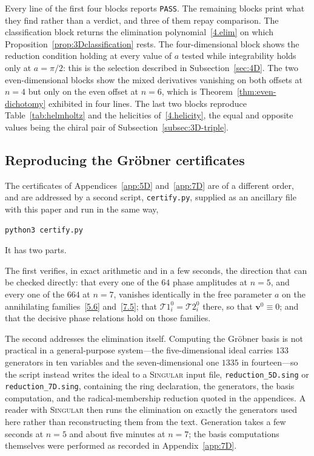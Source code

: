 \documentclass[11pt]{jfm}
\numberwithin{equation}{section}
\begin{document}
\noindent Every line of the first four blocks reports \texttt{PASS}. The remaining blocks print
what they find rather than a verdict, and three of them repay comparison. The classification block
returns the elimination polynomial~\eqref{4.elim} on which Proposition~\ref{prop:3Dclassification}
rests. The four-dimensional block shows the reduction condition holding at every value of $a$
tested while integrability holds only at $a=\pi/2$: this is the selection described in
Subsection~\ref{sec:4D}. The two even-dimensional blocks show the mixed derivatives vanishing on
both offsets at $n=4$ but only on the even offset at $n=6$, which is
Theorem~\ref{thm:even-dichotomy} exhibited in four lines. The last two blocks reproduce
Table~\ref{tab:helmholtz} and the helicities of~\eqref{4.helicity}, the equal and opposite values
being the chiral pair of Subsection~\ref{subsec:3D-triple}.

\subsection*{Reproducing the Gr\"obner certificates}
The certificates of Appendices~\ref{app:5D} and~\ref{app:7D} are of a different order, and are
addressed by a second script, \texttt{certify.py}, supplied as an ancillary file with this paper and
run in the same way,
\begin{verbatim}
python3 certify.py
\end{verbatim}
\noindent It has two parts.

The first verifies, in exact arithmetic and in a few seconds, the direction that can be checked
directly: that every one of the $64$ phase amplitudes at $n=5$, and every one of the $664$ at
$n=7$, vanishes identically in the free parameter $a$ on the annihilating families~\eqref{5.6}
and~\eqref{7.5}; that $\mathcal{T}1_i^0=\mathcal{T}2_i^0$ there, so that $\boldsymbol{v}^0\equiv0$;
and that the decisive phase relations hold on those families.

The second addresses the elimination itself. Computing the Gr\"obner basis is not practical in a
general-purpose system---the five-dimensional ideal carries $133$ generators in ten variables and
the seven-dimensional one $1335$ in fourteen---so the script instead writes the ideal to a
\textsc{Singular} input file, \texttt{reduction\_5D.sing} or \texttt{reduction\_7D.sing},
containing the ring declaration, the generators, the basis computation, and the
radical-membership reduction quoted in the appendices. A reader with \textsc{Singular} then runs
the elimination on exactly the generators used here rather than reconstructing them from the text.
Generation takes a few seconds at $n=5$ and about five minutes at $n=7$; the basis computations
themselves were performed as recorded in Appendix~\ref{app:7D}.
\end{document}
